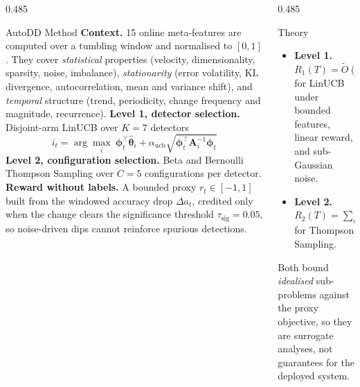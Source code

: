 \documentclass[final]{beamer}
\begin{document}
\begin{frame}[t]
\begin{columns}[t]
\begin{column}{0.485\textwidth}
\begin{block}{AutoDD Method}
\textbf{Context.} 15 online meta-features are computed over a tumbling window and
normalised to $[0,1]$. They cover \emph{statistical} properties (velocity,
dimensionality, sparsity, noise, imbalance), \emph{stationarity} (error
volatility, KL divergence, autocorrelation, mean and variance shift), and
\emph{temporal} structure (trend, periodicity, change frequency and magnitude,
recurrence).
\vskip10pt
\textbf{Level 1, detector selection.} Disjoint-arm LinUCB over $K=7$ detectors
\begin{equation*}
i_t=\arg\max_i\ \boldsymbol{\phi}_t^\top\hat{\boldsymbol{\theta}}_i
+\alpha_{\text{ucb}}\sqrt{\boldsymbol{\phi}_t^\top\mathbf{A}_i^{-1}\boldsymbol{\phi}_t}
\end{equation*}
\textbf{Level 2, configuration selection.} Beta and Bernoulli Thompson Sampling
over $C=5$ configurations per detector.
\vskip10pt
\textbf{Reward without labels.} A bounded proxy $r_t\in[-1,1]$ built from the
windowed accuracy drop $\Delta a_t$, credited only when the change clears the
significance threshold $\tau_{\text{sig}}=0.05$, so noise-driven dips cannot
reinforce spurious detections.
\end{block}


\end{column}

\begin{column}{0.485\textwidth}

\begin{block}{Theory}
\begin{itemize}
  \item \textbf{Level 1.} $R_1(T)=\tilde{O}(m\sqrt{KT})$ for LinUCB under bounded
        features, linear reward, and sub-Gaussian noise.
  \item \textbf{Level 2.} $R_2(T)=\sum_i O(\sqrt{C\,N_i(T)\log N_i(T)})$ for
        Thompson Sampling.
\end{itemize}
\vskip6pt
Both bound \emph{idealised} sub-problems against the proxy objective, so they
are surrogate analyses, not guarantees for the deployed system.
\end{block}


\end{column}
\end{columns}
\end{frame}
\end{document}
